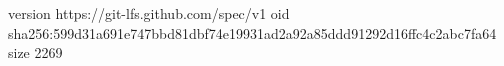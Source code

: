 version https://git-lfs.github.com/spec/v1
oid sha256:599d31a691e747bbd81dbf74e19931ad2a92a85ddd91292d16ffc4c2abc7fa64
size 2269
